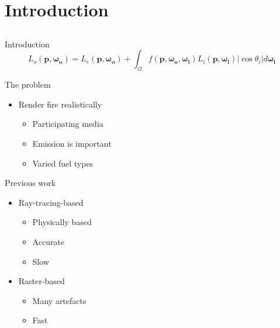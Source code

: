 \documentclass{beamer}
\begin{document}
\section{Introduction}
\subsection{ }

\begin{frame}{Introduction}
\begin{equation*}  
L_o (\mathbf{p}, \boldsymbol{\omega_o}) = L_e(\mathbf{p}, \boldsymbol{\omega_o}) + \int_\Omega f(\mathbf{p}, \boldsymbol{\omega_o}, \boldsymbol{\omega_i}) L_i(\mathbf{p}, \boldsymbol{\omega_i}) | \cos \theta_i | d \boldsymbol{\omega_i}
\end{equation*}



\end{frame}

\begin{frame}{The problem}
\begin{itemize}
\setlength\itemsep{0.5em}
\item Render fire realistically 
		\begin{itemize}
		\setlength\itemsep{0.5em}
		\item Participating media 
		\item Emission is important
		\item Varied fuel types
		\end{itemize}
\end{itemize}

\end{frame}

\begin{frame}{Previous work}

\begin{multicols}{2}

\begin{itemize}
\setlength\itemsep{0.5em}
\item Ray-tracing-based
		\begin{itemize}
		\setlength\itemsep{0.5em}
		\item Physically based 
		\item Accurate
		\item Slow
		\end{itemize}
\item Raster-based
		\begin{itemize}
		\setlength\itemsep{0.5em}
		\item Many artefacts
		\item Fast
		\end{itemize}
\end{itemize}


\end{multicols}


\end{frame}
\end{document}
